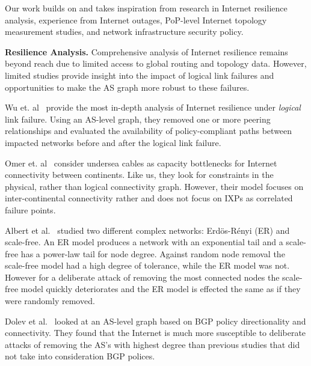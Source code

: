 Our work builds on and takes inspiration from research in Internet resilience analysis, experience from Internet outages, PoP-level Internet topology measurement studies, and network infrastructure security policy.

{\bf Resilience Analysis.}
    Comprehensive analysis of Internet resilience remains beyond reach due to limited access to global routing and topology data. 
    However, limited studies provide insight into the impact of logical link failures and opportunities to make the AS graph more robust to these failures.
    
    Wu et. al~\cite{michigan} provide the most in-depth analysis of Internet resilience under {\it logical} link failure.
    Using an AS-level graph, they removed one or more peering relationships and evaluated the availability of policy-compliant paths between impacted networks before and after the logical link failure.

    Omer et. al~\cite{measuringresilience} consider undersea cables as capacity bottlenecks for Internet connectivity between continents. 
    Like us, they look for constraints in the physical, rather than logical connectivity graph. 
    However, their model focuses on inter-continental connectivity rather and does not focus on IXPs as correlated failure points. 

    Albert et al.~\cite{resilience-complex-networks} studied two different
    complex networks: Erd\"{o}s-R\'{e}nyi (ER) and scale-free. An ER model
    produces a network with an exponential tail and a scale-free has a power-law
    tail for node degree. Against random node removal the scale-free model had a
    high degree of tolerance, while the ER model was not. However for a
    deliberate attack of removing the most connected nodes the scale-free model
    quickly deteriorates and the ER model is effected the same as if they were
    randomly removed.

    Dolev et al.~\cite{resilience-under-BGP} looked at an AS-level graph based
    on BGP policy directionality and connectivity. They found that the Internet
    is much more susceptible to deliberate attacks of removing the AS's with
    highest degree than previous studies that did not take into consideration
    BGP polices.
    
